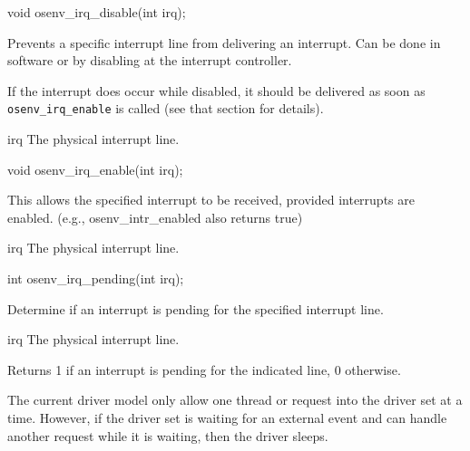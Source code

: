 \begin{apisyn}
	\funcproto void osenv_irq_disable(int irq);
\end{apisyn}
\drvtoosn
\begin{apidesc}
	Prevents a specific interrupt line from delivering an
	interrupt.  Can be done in software or by disabling
	at the interrupt controller.

	If the interrupt does occur while disabled,
	it should be delivered as soon as {\tt osenv_irq_enable}
	is called (see that section for details).
\end{apidesc}
\begin{apiparm}
	\item[irq]
		The physical interrupt line.
\end{apiparm}


\begin{apisyn}
	\funcproto void osenv_irq_enable(int irq);
\end{apisyn}
\drvtoosn
\begin{apidesc}
	This allows the specified interrupt to be received,
	provided interrupts are enabled.
	(e.g., osenv_intr_enabled also returns true)
\end{apidesc}
\begin{apiparm}
	\item[irq]
		The physical interrupt line.
\end{apiparm}

\begin{apisyn}
	\funcproto int osenv_irq_pending(int irq);
\end{apisyn}
\drvtoosn
\begin{apidesc}
	Determine if an interrupt is pending for the specified interrupt line.
\end{apidesc}
\begin{apiparm}
	\item[irq]
		The physical interrupt line.
\end{apiparm}
\begin{apiret}
	Returns 1 if an interrupt is pending for the indicated line,
	0 otherwise.
\end{apiret}




The current driver model only allow one thread or request into
the driver set at a time.
However, if the driver set is waiting for an external event and
can handle another request while it is waiting,
then the driver sleeps.

